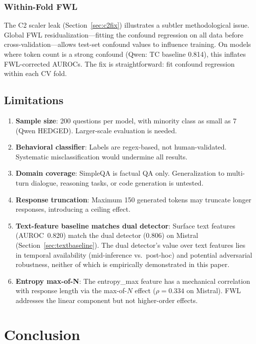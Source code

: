 \documentclass[11pt,a4paper]{article}
\begin{document}
\subsubsection{Within-Fold FWL}

The C2 scaler leak (Section~\ref{sec:c2fix}) illustrates a subtler methodological issue. Global FWL residualization---fitting the confound regression on all data before cross-validation---allows test-set confound values to influence training. On models where token count is a strong confound (Qwen: TC baseline 0.814), this inflates FWL-corrected AUROCs. The fix is straightforward: fit confound regression within each CV fold.

\subsection{Limitations}

\begin{enumerate}[nosep]
    \item \textbf{Sample size}: 200 questions per model, with minority class as small as 7 (Qwen HEDGED). Larger-scale evaluation is needed.
    \item \textbf{Behavioral classifier}: Labels are regex-based, not human-validated. Systematic misclassification would undermine all results.
    \item \textbf{Domain coverage}: SimpleQA is factual QA only. Generalization to multi-turn dialogue, reasoning tasks, or code generation is untested.
    \item \textbf{Response truncation}: Maximum 150 generated tokens may truncate longer responses, introducing a ceiling effect.
    \item \textbf{Text-feature baseline matches dual detector}: Surface text features (AUROC~0.820) match the dual detector (0.806) on Mistral (Section~\ref{sec:textbaseline}). The dual detector's value over text features lies in temporal availability (mid-inference vs.\ post-hoc) and potential adversarial robustness, neither of which is empirically demonstrated in this paper.
    \item \textbf{Entropy max-of-N}: The entropy\_max feature has a mechanical correlation with response length via the max-of-$N$ effect ($\rho = 0.334$ on Mistral). FWL addresses the linear component but not higher-order effects.
\end{enumerate}

\section{Conclusion}
\label{sec:conclusion}
\end{document}
